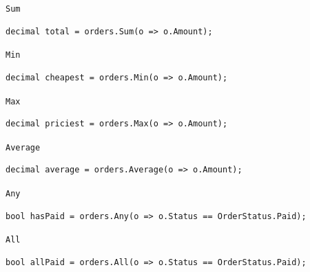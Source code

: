 \documentclass[aspectratio=169,10pt,t]{beamer}
\begin{document}
\begin{frame}[fragile]{\texttt{Sum}}
  \slidetop
\begin{lstlisting}[style=csharp,basicstyle=\ttfamily\small]
decimal total = orders.Sum(o => o.Amount);
\end{lstlisting}
\end{frame}

\begin{frame}[fragile]{\texttt{Min}}
  \slidetop
\begin{lstlisting}[style=csharp,basicstyle=\ttfamily\small]
decimal cheapest = orders.Min(o => o.Amount);
\end{lstlisting}
\end{frame}

\begin{frame}[fragile]{\texttt{Max}}
  \slidetop
\begin{lstlisting}[style=csharp,basicstyle=\ttfamily\small]
decimal priciest = orders.Max(o => o.Amount);
\end{lstlisting}
\end{frame}

\begin{frame}[fragile]{\texttt{Average}}
  \slidetop
\begin{lstlisting}[style=csharp,basicstyle=\ttfamily\small]
decimal average = orders.Average(o => o.Amount);
\end{lstlisting}
\end{frame}

\begin{frame}[fragile]{\texttt{Any}}
  \slidetop
\begin{lstlisting}[style=csharp,basicstyle=\ttfamily\small]
bool hasPaid = orders.Any(o => o.Status == OrderStatus.Paid);
\end{lstlisting}
  \slidegap
\end{frame}

\begin{frame}[fragile]{\texttt{All}}
  \slidetop
\begin{lstlisting}[style=csharp,basicstyle=\ttfamily\small]
bool allPaid = orders.All(o => o.Status == OrderStatus.Paid);
\end{lstlisting}
\end{frame}
\end{document}
